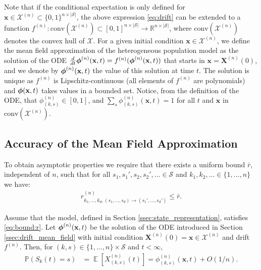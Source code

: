 \documentclass[acmsmall]{acmart}
\newcommand\bx{\mathbf{x}}
\newcommand\bX{\mathbf{X}}
\newcommand\bphi{\text{\boldmath$\phi$}}
\newcommand\calX{\mathcal{X}}
\newcommand\calS{\mathcal{S}}
\newcommand\toN{^{(n)}}
\newcommand\ns{n\times|\calS|} %
\newcommand{\R}{\ensuremath{\mathbb{R}}}
\DeclareMathOperator{\E}{\mathbb{E}} %
\newcommand\Proba[1]{\mathbb{P}\left(#1\right)} %
\newcommand\esp[1]{\E\left[#1\right]} %
\newcommand\conv[1]{\mathrm{conv}(#1)}      %
\begin{document}
\color{black}Note that if the conditional expectation is only defined for $\bx\in\calX\toN\subset\{0,1\}^{\ns}$, the above expression \eqref{eq:drift} can be extended to a function $f\toN:\conv{\calX\toN}\subset[0,1]^{\ns}\to\R^{\ns}$, where $\conv{\calX\toN}$ denotes the convex hull of $\calX$. For a given initial condition $\bx \in \calX\toN$, we define the mean field approximation of the heterogeneous population model as the solution  of the ODE $\frac{d}{dt} \bphi\toN(\bx,t) = f\toN(\bphi\toN(\bx, t))$ that starts in $\bx =\bX\toN(0)$, and we denote by $\bphi\toN(\bx, t)$ the value of this solution at time $t$. The solution is unique as $f\toN$ is Lipschitz-continuous (all elements of $f\toN$ are polynomials) and $\bphi(\bx, t)$ takes values in a bounded set. Notice, from the definition of the ODE, that $\phi\toN_{(k,s)}\in[0,1]$, and  $\sum_{s} \phi\toN_{(k,s)}(\bx,t) = 1$ for all $t$ and $\bx$ in $\conv{\calX\toN}$. 


\subsection{Accuracy of the Mean Field Approximation}

To obtain asymptotic properties we require that there exists a uniform bound $\bar{r}$, independent of $n$, such that for all $s_1,s_1',s_2,s_2',... \in \calS$ and $k_1,k_2,\hdots \in \{1,\ldots, n\}$ we have:
\begin{align}
  r\toN_{k_1,\hdots,k_d, (s_1,\hdots,s_d)\rightarrow(s_1',\hdots,s_d')} \leq \bar{r}. \label{eq:bound:r}
\end{align}

\begin{theorem}
  \label{th:MF}
  Assume that the model, defined in Section \ref{ssec:state_representation}, satisfies \eqref{eq:bound:r}. Let $\bphi\toN(\bx, t)$ be the solution of the ODE introduced in Section \ref{ssec:drift_mean_field} with initial condition $\bX\toN(0)= \bx \in \calX\toN $ and drift $f\toN$. Then, for $(k,s)\in \{1,\ldots,n\}\times \calS$ and $t < \infty$,
  \begin{align}
    \label{eq:MF_theorem}
    \Proba{S_k(t)=s} &= \esp{X\toN_{(k,s)}(t) } = \phi\toN_{(k,s)}(\bx,t) + O(1/n).
  \end{align}
\end{theorem}
\end{document}
